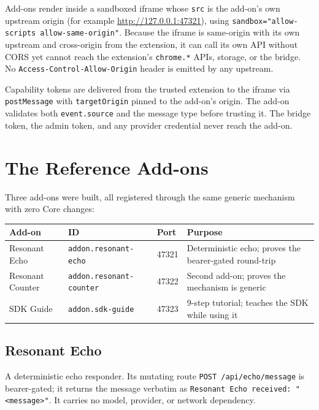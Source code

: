 \documentclass[11pt]{article}
\begin{document}
Add-ons render inside a sandboxed iframe whose \texttt{src} is the add-on's own
upstream origin (for example \url{http://127.0.0.1:47321}), using
\texttt{sandbox="allow-scripts allow-same-origin"}. Because the iframe is
same-origin with its own upstream and cross-origin from the extension, it can
call its own API without CORS yet cannot reach the extension's
\texttt{chrome.*} APIs, storage, or the bridge. No
\texttt{Access-Control-Allow-Origin} header is emitted by any upstream.

Capability tokens are delivered from the trusted extension to the iframe via
\texttt{postMessage} with \texttt{targetOrigin} pinned to the add-on's origin.
The add-on validates both \texttt{event.source} and the message type before
trusting it. The bridge token, the admin token, and any provider credential
never reach the add-on.

\section{The Reference Add-ons}

Three add-ons were built, all registered through the same generic mechanism
with zero Core changes:

\begin{center}
\begin{tabular}{@{}p{3.0cm}p{3.4cm}p{2.5cm}p{3.4cm}@{}}
\toprule
\textbf{Add-on} & \textbf{ID} & \textbf{Port} & \textbf{Purpose} \\
\midrule
Resonant Echo & \texttt{addon.resonant-echo} & 47321 & Deterministic echo; proves the bearer-gated round-trip \\
Resonant Counter & \texttt{addon.resonant-counter} & 47322 & Second add-on; proves the mechanism is generic \\
SDK Guide & \texttt{addon.sdk-guide} & 47323 & 9-step tutorial; teaches the SDK while using it \\
\bottomrule
\end{tabular}
\end{center}

\subsection{Resonant Echo}

A deterministic echo responder. Its mutating route \texttt{POST
/api/echo/message} is bearer-gated; it returns the message verbatim as
\texttt{Resonant Echo received: "<message>"}. It carries no model, provider, or
network dependency.
\end{document}
